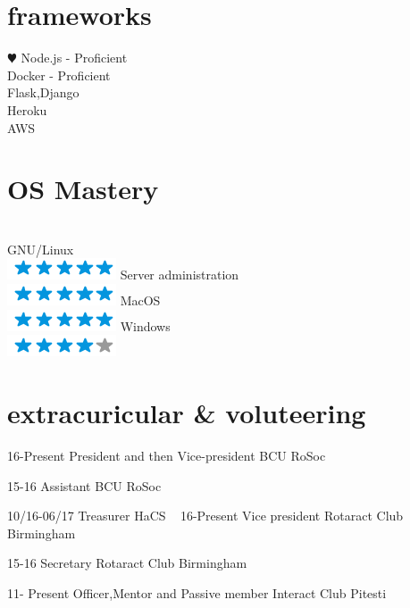 \documentclass[]{friggeri-cv}
\begin{document}
  



\newpage

\begin{aside2}
  \section{frameworks}
    {\color{red} $\varheartsuit$} 
    Node.js - Proficient \\
    Docker - Proficient \\
    Flask,Django \\
    Heroku \\
    AWS \\
    
  \section{OS Mastery}
  \\GNU/Linux  \\\includegraphics[scale=0.30]{img/5stars.png}
  Server administration \\\includegraphics[scale=0.30]{img/5stars.png}
  MacOS  \\\includegraphics[scale=0.30]{img/5stars.png}
  Windows  \\\includegraphics[scale=0.30]{img/4stars.png}
\end{aside2}


\section{extracuricular \& voluteering}
\begin{entrylist}


    
    
    \entry
    {16-Present}
    {President and then Vice-president}
    {BCU RoSoc}
    
    \entry
    {15-16}
    {Assistant}
    {BCU RoSoc}
    
     \entry
    {10/16-06/17}
    {Treasurer}
    {HaCS}
    ~ 
     \entry
    {16-Present}
    {Vice president}
    {Rotaract Club Birmingham}
    
    \entry
    {15-16}
    {Secretary}
    {Rotaract Club Birmingham}
    ~
    
    \entry
    {11- Present}
    {Officer,Mentor and Passive member}
    {Interact Club Pitesti}
    ~
\end{entrylist}
\end{document}
